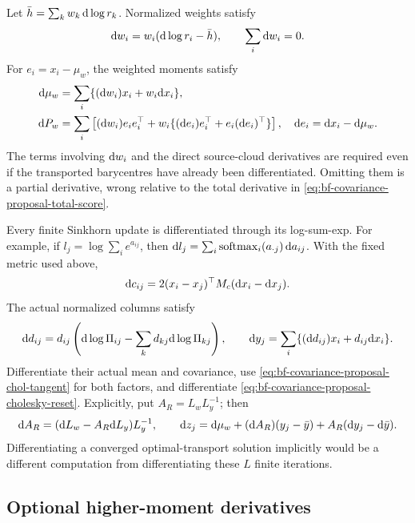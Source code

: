 Let \(\bar h=\sum_kw_k\,\mathrm d\log r_k\). Normalized weights satisfy
\begin{equation}
\label{eq:bf-covariance-proposal-weight-tangent}
 \mathrm d w_i=w_i(\mathrm d\log r_i-\bar h),\qquad \sum_i\mathrm d w_i=0.
\end{equation}
For \(e_i=x_i-\mu_w\), the weighted moments satisfy
\begin{align}
\label{eq:bf-covariance-proposal-weighted-moment-tangent}
 \mathrm d\mu_w
   &=\sum_i\{(\mathrm d w_i)x_i+w_i\mathrm d x_i\},\\
 \mathrm d P_w
   &=\sum_i\left[
      (\mathrm d w_i)e_ie_i^\top+
      w_i\{(\mathrm d e_i)e_i^\top+e_i(\mathrm d e_i)^\top\}\right],
 \quad \mathrm d e_i=\mathrm d x_i-\mathrm d\mu_w.\nonumber
\end{align}
The terms involving \(\mathrm d w_i\) and the direct source-cloud derivatives
are required even if the transported barycentres have already been
differentiated. Omitting them is a partial derivative, wrong relative to
the total derivative in \eqref{eq:bf-covariance-proposal-total-score}.

Every finite Sinkhorn update is differentiated through its log-sum-exp.
For example, if \(l_j=\log\sum_i e^{a_{ij}}\), then
\(\mathrm d l_j=\sum_i\operatorname{softmax}_i(a_{\cdot j})\,\mathrm d a_{ij}\).
With the fixed metric used above,
\[
 \mathrm d c_{ij}
 =2(x_i-x_j)^\top M_c(\mathrm d x_i-\mathrm d x_j).
\]
The actual normalized columns satisfy
\[
 \mathrm d d_{ij}
 =d_{ij}\left(\mathrm d\log\Pi_{ij}
       -\sum_kd_{kj}\mathrm d\log\Pi_{kj}\right),\qquad
 \mathrm d y_j=\sum_i\{(\mathrm d d_{ij})x_i+d_{ij}\mathrm d x_i\}.
\]
Differentiate their actual mean and covariance, use
\eqref{eq:bf-covariance-proposal-chol-tangent} for both factors, and differentiate
\eqref{eq:bf-covariance-proposal-cholesky-reset}. Explicitly, put
\(A_R=L_wL_y^{-1}\); then
\[
 \mathrm d A_R=(\mathrm d L_w-A_R\mathrm d L_y)L_y^{-1},\qquad
 \mathrm d z_j=\mathrm d\mu_w+(\mathrm d A_R)(y_j-\bar y)
                         +A_R(\mathrm d y_j-\mathrm d\bar y).
\]
Differentiating a converged optimal-transport solution implicitly would
be a different computation from differentiating these \(L\) finite
iterations.

\subsection{Optional higher-moment derivatives}

